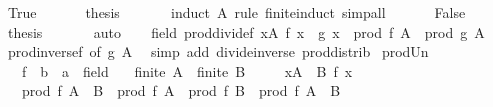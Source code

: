 \begin{isabellebody}
\ True\isanewline
\ \ \ \isamarkupfalse%
\ \isamarkupfalse%
\ {\isacharquery}{\kern0pt}thesis\isanewline
\ \ \ \ \ \isamarkupfalse%
\ {\isacharparenleft}{\kern0pt}induct\ A\ rule{\isacharcolon}{\kern0pt}\ finite{\isacharunderscore}{\kern0pt}induct{\isacharparenright}{\kern0pt}\ simp{\isacharunderscore}{\kern0pt}all\isanewline
\ \isamarkupfalse%
\isanewline
\ \ \ \isamarkupfalse%
\ False\isanewline
\ \ \ \isamarkupfalse%
\ \isamarkupfalse%
\ {\isacharquery}{\kern0pt}thesis\isanewline
\ \ \ \ \ \isamarkupfalse%
\ auto\isanewline
\ \isamarkupfalse%
%
\endisatagproof
{\isafoldproof}%
%
\isadelimproof
\isanewline
%
\endisadelimproof
\isanewline
{}\isamarkupfalse%
\ {\isacharparenleft}{\kern0pt}\ field{\isacharparenright}{\kern0pt}\ prod{\isacharunderscore}{\kern0pt}dividef{\isacharcolon}{\kern0pt}\ {\isachardoublequoteopen}{\isacharparenleft}{\kern0pt}{\isasymProd}x{\isasymin}A{\isachardot}{\kern0pt}\ f\ x\ {\isacharslash}{\kern0pt}\ g\ x{\isacharparenright}{\kern0pt}\ {\isacharequal}{\kern0pt}\ prod\ f\ A\ {\isacharslash}{\kern0pt}\ prod\ g\ A{\isachardoublequoteclose}\isanewline
%
\isadelimproof
\ \ %
\endisadelimproof
%
\isatagproof
{}\isamarkupfalse%
\ prod{\isacharunderscore}{\kern0pt}inversef\ {\isacharbrackleft}{\kern0pt}of\ g\ A{\isacharbrackright}{\kern0pt}\ \isamarkupfalse%
\ {\isacharparenleft}{\kern0pt}simp\ add{\isacharcolon}{\kern0pt}\ divide{\isacharunderscore}{\kern0pt}inverse\ prod{\isachardot}{\kern0pt}distrib{\isacharparenright}{\kern0pt}%
\endisatagproof
{\isafoldproof}%
%
\isadelimproof
\isanewline
%
\endisadelimproof
\isanewline
{}\isamarkupfalse%
\ prod{\isacharunderscore}{\kern0pt}Un{\isacharcolon}{\kern0pt}\isanewline
\ \ \ f\ {\isacharcolon}{\kern0pt}{\isacharcolon}{\kern0pt}\ {\isachardoublequoteopen}{\isacharprime}{\kern0pt}b\ {\isasymRightarrow}\ {\isacharprime}{\kern0pt}a\ {\isacharcolon}{\kern0pt}{\isacharcolon}{\kern0pt}\ field{\isachardoublequoteclose}\isanewline
\ \ \ {\isachardoublequoteopen}finite\ A{\isachardoublequoteclose}\ \ {\isachardoublequoteopen}finite\ B{\isachardoublequoteclose}\isanewline
\ \ \ \ \ {\isachardoublequoteopen}{\isasymforall}x{\isasymin}A\ {\isasyminter}\ B{\isachardot}{\kern0pt}\ f\ x\ {\isasymnoteq}\ {}{\isachardoublequoteclose}\isanewline
\ \ \ {\isachardoublequoteopen}prod\ f\ {\isacharparenleft}{\kern0pt}A\ {\isasymunion}\ B{\isacharparenright}{\kern0pt}\ {\isacharequal}{\kern0pt}\ prod\ f\ A\ {\isacharasterisk}{\kern0pt}\ prod\ f\ B\ {\isacharslash}{\kern0pt}\ prod\ f\ {\isacharparenleft}{\kern0pt}A\ {\isasyminter}\ B{\isacharparenright}{\kern0pt}{\isachardoublequoteclose}\isanewline

\end{isabellebody}
